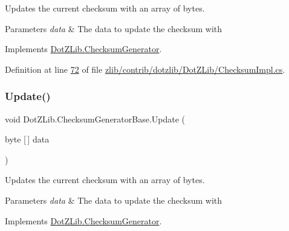 Updates the current checksum with an array of bytes. 


\begin{DoxyParams}{Parameters}
{\em data} & The data to update the checksum with\\
\hline
\end{DoxyParams}


Implements \hyperlink{interface_dot_z_lib_1_1_checksum_generator_a10930844922e72671843dd5c97709394}{Dot\+Z\+Lib.\+Checksum\+Generator}.



Definition at line \hyperlink{zlib_2contrib_2dotzlib_2_dot_z_lib_2_checksum_impl_8cs_source_l00072}{72} of file \hyperlink{zlib_2contrib_2dotzlib_2_dot_z_lib_2_checksum_impl_8cs_source}{zlib/contrib/dotzlib/\+Dot\+Z\+Lib/\+Checksum\+Impl.\+cs}.

\mbox{\label{class_dot_z_lib_1_1_checksum_generator_base_a3fafe3e0c2fa80fb2cbbdce82a76bc84}} 
\subsubsection{\texorpdfstring{Update()}{Update()}\hspace{0.1cm}{\footnotesize\ttfamily [4/8]}}
{\footnotesize\ttfamily void Dot\+Z\+Lib.\+Checksum\+Generator\+Base.\+Update (\begin{DoxyParamCaption}\item[{byte \mbox{[}$\,$\mbox{]}}]{data }\end{DoxyParamCaption})\hspace{0.3cm}{\ttfamily [inline]}}



Updates the current checksum with an array of bytes. 


\begin{DoxyParams}{Parameters}
{\em data} & The data to update the checksum with\\
\hline
\end{DoxyParams}


Implements \hyperlink{interface_dot_z_lib_1_1_checksum_generator_a10930844922e72671843dd5c97709394}{Dot\+Z\+Lib.\+Checksum\+Generator}.




